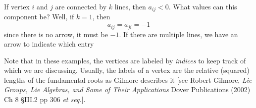 \begin{framed}
If vertex $i$ and $j$ are connected by $k$ lines, then $a_{ij}<0$. 
What values can this component be? Well, if $k=1$, then
\begin{equation}
a_{ij}=a_{ji}=-1
\end{equation}
since there is no arrow, it must be $-1$. If there are multiple
lines, we have an arrow to indicate which entry 

\begin{rmk}
Note that in these examples, the vertices are labeled by
\emph{indices} to keep track of which we are discussing. Usually,
the labels of a vertex are the relative (squared)
lengths of the fundamental roots as Gilmore describes
it [see Robert Gilmore, \emph{Lie Groups, Lie Algebras, and Some
    of Their Applications} Dover Publications (2002) Ch 8 \S III.2 pp 306 \emph{et seq.}].


\end{rmk}
\end{framed}

